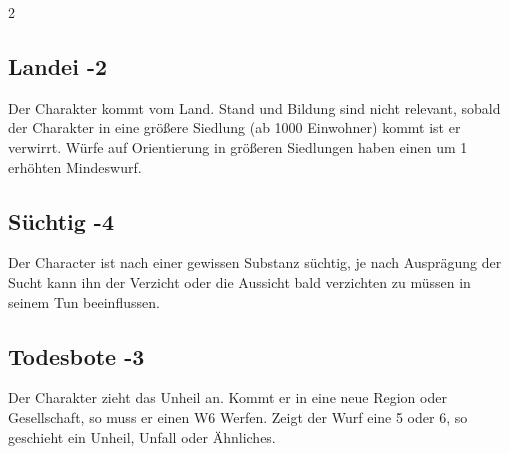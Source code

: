 \begin{multicols}{2}
\begin{tcolorbox}
    \subsection*{Landei \hfill \small{-2 }}
    \tcblower
Der Charakter kommt vom Land. Stand und Bildung sind nicht relevant, sobald der Charakter in eine größere Siedlung (ab 1000 Einwohner) kommt ist er verwirrt. Würfe auf Orientierung in größeren Siedlungen haben einen um 1 erhöhten Mindeswurf.


\vspace{3mm}



\end{tcolorbox}

\begin{tcolorbox}
    \subsection*{Süchtig \hfill \small{-4 }}
    \tcblower
Der Character ist nach einer gewissen Substanz süchtig, je nach Ausprägung der Sucht kann ihn der Verzicht oder die Aussicht bald verzichten zu müssen in seinem Tun beeinflussen.


\vspace{3mm}



\end{tcolorbox}

\begin{tcolorbox}
    \subsection*{Todesbote \hfill \small{-3 }}
    \tcblower
Der Charakter zieht das Unheil an. Kommt er in eine neue Region oder Gesellschaft, so muss er einen W6 Werfen. Zeigt der Wurf eine 5 oder 6, so geschieht ein Unheil, Unfall oder Ähnliches.


\vspace{3mm}




\end{tcolorbox}
\end{multicols}
